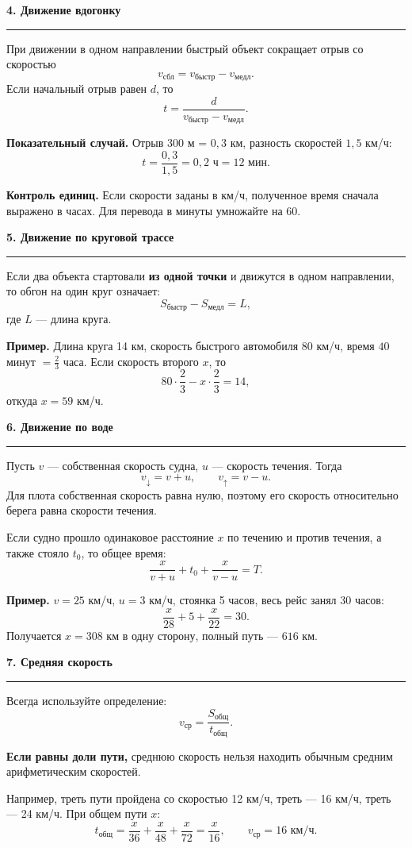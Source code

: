 \documentclass[a4paper,12pt]{article}
\newcommand{\sectiontitle}[1]{%
  \vspace{2mm}%
  {\Large\bfseries\color{darkaccent}#1}\par
  \vspace{1mm}\color{rulegray}\hrule\color{textgray}\vspace{3mm}%
}
\newcommand{\key}[1]{\textbf{\color{darkaccent}#1}}
\newcommand{\formula}[1]{\[\displaystyle #1\]}
\begin{document}
\sectiontitle{4. Движение вдогонку}

При движении в одном направлении быстрый объект сокращает отрыв со скоростью
\formula{v_{\text{сбл}}=v_{\text{быстр}}-v_{\text{медл}}.}
Если начальный отрыв равен $d$, то
\formula{t=\frac{d}{v_{\text{быстр}}-v_{\text{медл}}}.}

\textbf{Показательный случай.} Отрыв 300 м = $0{,}3$ км, разность скоростей $1{,}5$ км/ч:
\formula{t=\frac{0{,}3}{1{,}5}=0{,}2\text{ ч}=12\text{ мин}.}

\key{Контроль единиц.} Если скорости заданы в км/ч, полученное время сначала выражено в часах. Для перевода в минуты умножайте на 60.

\sectiontitle{5. Движение по круговой трассе}

Если два объекта стартовали \textbf{из одной точки} и движутся в одном направлении, то обгон на один круг означает:
\formula{S_{\text{быстр}}-S_{\text{медл}}=L,}
где $L$ — длина круга.

\textbf{Пример.} Длина круга 14 км, скорость быстрого автомобиля $80$ км/ч, время $40$ минут $=\frac23$ часа. Если скорость второго $x$, то
\formula{80\cdot\frac23-x\cdot\frac23=14,}
откуда $x=59$ км/ч.

\clearpage

\sectiontitle{6. Движение по воде}

Пусть $v$ — собственная скорость судна, $u$ — скорость течения. Тогда
\formula{v_{\downarrow}=v+u,\qquad v_{\uparrow}=v-u.}
Для плота собственная скорость равна нулю, поэтому его скорость относительно берега равна скорости течения.

Если судно прошло одинаковое расстояние $x$ по течению и против течения, а также стояло $t_0$, то общее время:
\formula{\frac{x}{v+u}+t_0+\frac{x}{v-u}=T.}

\textbf{Пример.} $v=25$ км/ч, $u=3$ км/ч, стоянка 5 часов, весь рейс занял 30 часов:
\formula{\frac{x}{28}+5+\frac{x}{22}=30.}
Получается $x=308$ км в одну сторону, полный путь — $616$ км.

\sectiontitle{7. Средняя скорость}

Всегда используйте определение:
\formula{v_{\text{ср}}=\frac{S_{\text{общ}}}{t_{\text{общ}}}.}

\textbf{Если равны доли пути,} среднюю скорость нельзя находить обычным средним арифметическим скоростей.

Например, треть пути пройдена со скоростью 12 км/ч, треть — 16 км/ч, треть — 24 км/ч. При общем пути $x$:
\formula{t_{\text{общ}}=\frac{x}{36}+\frac{x}{48}+\frac{x}{72}=\frac{x}{16},\qquad v_{\text{ср}}=16\text{ км/ч}.}
\end{document}
